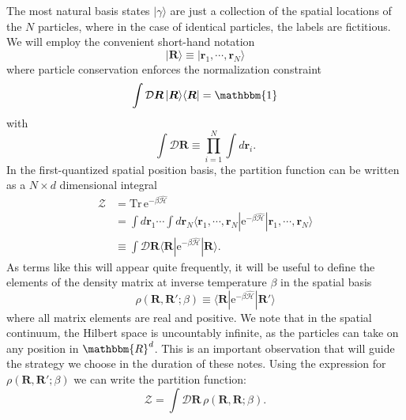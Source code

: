 \documentclass[prb,aps,amssym,nofootinbib,floatfix,notitlepage]{revtex4-1}
\renewcommand{\vec}[1]{\boldsymbol{#1}}
\newcommand{\e}[1]{\mathrm{e}^{#1}}
\newcommand{\R}{\vec{R}}
\begin{document}
The most natural basis states $|\gamma\rangle$ are just a
collection of the spatial locations of the $N$ particles, where in the case of
identical particles, the labels are fictitious. We will employ the convenient
short-hand notation 
%
\begin{equation}
    |\R\rangle \equiv |\vec{r}_1, \cdots, \vec{r}_N \rangle
\end{equation}
%
where particle conservation enforces the normalization constraint
%
\begin{equation}
\int \mathcal{D}\R\, |\R\rangle \langle \R | = \mathbbm{1}
\label{eq:Norm}
\end{equation}
%
with 
%
\begin{equation}
    \int\mathcal{D} \R  \equiv \prod_{i=1}^N \int d \vec{r}_i.
\end{equation}
%
In the first-quantized spatial position basis, the partition function can be
written as a $N \times d$ dimensional integral
%
\begin{align}
    \mathcal{Z} &= \mathrm{Tr}\, \e{-\beta \hat{\mathcal{H}}}  \nonumber \\
                &= \int d\vec{r}_1 \cdots \int d\vec{r}_N \langle \vec{r}_1,
    \cdots, \vec{r}_N | \e{-\beta \hat{\mathcal{H}}}| \vec{r}_1, \cdots,
    \vec{r}_N \rangle \nonumber \\
&\equiv \int \mathcal{D} \R \langle \R | \e{-\beta \hat{\mathcal{H}}} | \R
    \rangle.
\label{eq:ZDR}
\end{align}
%
As terms like this will appear quite frequently, it will be useful to define
the elements of the density matrix at inverse temperature $\beta$ in the
spatial basis
%
\begin{equation}
    \rho(\R, \R'; \beta) \equiv \langle \R | \e{-\beta \hat{\mathcal{H}}} |
    \R'\rangle
\end{equation}
%
where all matrix elements are real and positive. We note that in the spatial
continuum, the Hilbert space is uncountably infinite, as the particles can take
on any position in $\mathbbm{R}^d$. This is an important observation that will
guide the strategy we choose in the duration of these notes. Using the
expression for $\rho(\R,\R';\beta)$ we can write the partition function:
%
\begin{equation}
\mathcal{Z} = \int \mathcal{D}\R \, \rho(\R,\R;\beta).
\label{eq:Zrho}
\end{equation}
%
\end{document}

